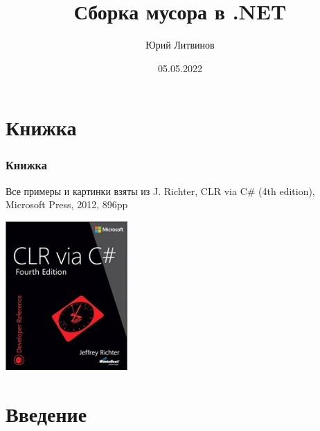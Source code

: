 \documentclass[xetex,mathserif,serif]{beamer}
\title{Сборка мусора в .NET}
\author{Юрий Литвинов}
\date{05.05.2022}
\begin{document}
    \frame{\titlepage}
    
    \section{Книжка}

    \begin{frame}
        \frametitle{Книжка}
        Все примеры и картинки взяты из J. Richter, CLR via C\# (4th edition), Microsoft Press, 2012, 896pp
        \begin{center}
            \includegraphics[width=0.35\textwidth]{richterCover.png}
        \end{center}
    \end{frame}

    \section{Введение}
\end{document}
